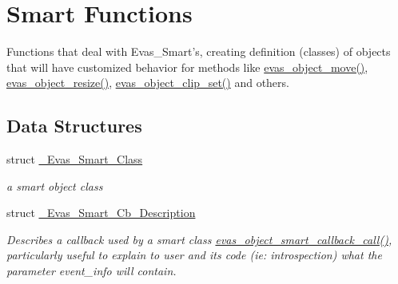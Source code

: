 \section{Smart Functions}
\label{group__Evas__Smart__Group}


Functions that deal with Evas\_\-Smart's, creating definition (classes) of objects that will have customized behavior for methods like \hyperlink{group__Evas__Object__Group__Basic_ga78fa8858c51707f1a557b720014b71cc}{evas\_\-object\_\-move()}, \hyperlink{group__Evas__Object__Group__Basic_ga34df8b33704deafd2a25f40e3c09d149}{evas\_\-object\_\-resize()}, \hyperlink{group__Evas__Object__Group__Basic_ga19eabaaeec1ea375366e201f533f3d56}{evas\_\-object\_\-clip\_\-set()} and others.  


\subsection*{Data Structures}
\begin{DoxyCompactItemize}
\item 
struct \hyperlink{struct__Evas__Smart__Class}{\_\-Evas\_\-Smart\_\-Class}
\begin{DoxyCompactList}\small\item\em a smart object class \item\end{DoxyCompactList}\item 
struct \hyperlink{struct__Evas__Smart__Cb__Description}{\_\-Evas\_\-Smart\_\-Cb\_\-Description}
\begin{DoxyCompactList}\small\item\em Describes a callback used by a smart class \hyperlink{group__Evas__Smart__Object__Group_ga17bbe660f5bf9d8997913b08882f6f9e}{evas\_\-object\_\-smart\_\-callback\_\-call()}, particularly useful to explain to user and its code (ie: introspection) what the parameter {\ttfamily event\_\-info} will contain. \item\end{DoxyCompactList}\end{DoxyCompactItemize}
